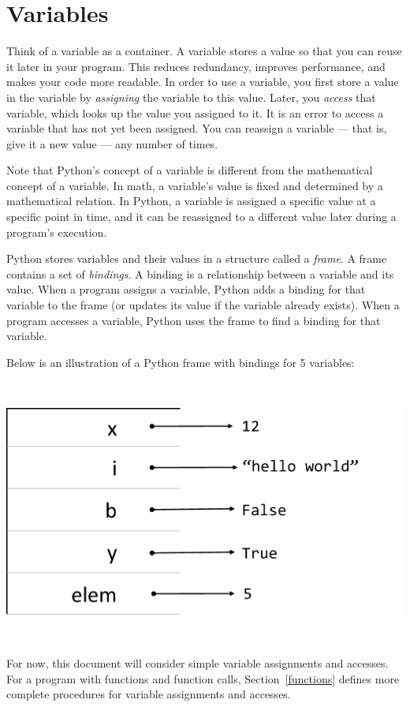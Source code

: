 \documentclass{article}
\newcommand{\pretabularspace}{\ifhevea\else \strut \\ \strut \fi}
\newcommand{\posttabularspace}{\ifhevea\else \strut \\ \strut \fi}
\begin{document}
\section{Variables}

Think of a variable as a container.  A variable stores a value so that you
can reuse it later in your program.  This reduces redundancy, improves
performance, and makes your code more readable.  In order to use a
variable, you first store a value in the variable by \emph{assigning} the
variable to this value.  Later, you \emph{access} that variable, which
looks up the value you assigned to it.  It is an error to access a variable
that has not yet been assigned.  You can reassign a variable --- that is,
give it a new value --- any number of times.

Note that Python's concept of a variable is different from the mathematical
concept of a variable.  In math, a variable's value is fixed and determined
by a mathematical relation.  In Python, a variable is assigned a specific
value at a specific point in time, and it can be reassigned to a different
value later during a program's execution.

Python stores variables and their values in a structure called a
\emph{frame}.  A frame contains a set of \emph{bindings}.  A binding is a
relationship between a variable and its value.  When a program assigns a
variable, Python adds a binding for that variable to the frame (or updates
its value if the variable already exists).  When a program accesses a
variable, Python uses the frame to find a binding for that variable.

Below is an illustration of a Python frame with bindings for 5 variables:

  \pretabularspace
  \includegraphics{diagrams/bindings-2}
  \posttabularspace

  For now, this document will consider simple variable assignments and accesses. For a program with functions and function calls, Section~\ref{functions} defines more complete procedures for variable assignments and accesses.
\end{document}

